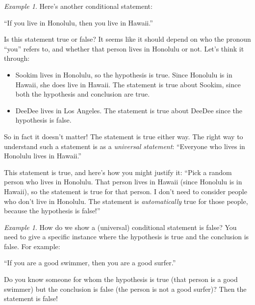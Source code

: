 \documentclass[10pt, reqno]{amsart}
\theoremstyle{remark}
\newtheorem{example}[thm]{Example}
\theoremstyle{definition}
\numberwithin{equation}{section}  %
\begin{document}
\begin{example}
Here's another conditional statement:
\begin{center}
``If you live in Honolulu, then you live in Hawaii.''
\end{center}
Is this statement true or false?  It seems like it should depend on who the pronoun ``you'' refers to, and whether that person lives in Honolulu or not.  Let's think it through:
\begin{itemize}
\item
Sookim lives in Honolulu, so the hypothesis is true.  Since Honolulu is in Hawaii, she does live in Hawaii.  The statement is true about Sookim, since both the hypothesis and conclusion are true.
\item
DeeDee lives in Los Angeles.  The statement is true about DeeDee since the hypothesis is false.
\end{itemize} 

So in fact it doesn't matter!  The statement is true either way.  The right way to understand such a statement is as a \emph{universal statement}: ``Everyone who lives in Honolulu lives in Hawaii.''  

This statement is true, and here's how you might justify it:  ``Pick a random person who lives in Honolulu.  That person lives in Hawaii (since Honolulu is in Hawaii), so the statement is true for that person.  I don't need to consider people who don't live in Honolulu.  The statement is \emph{automatically} true for those people, because the hypothesis is false!''
\end{example}

\begin{example}
How do we show a (universal) conditional statement is false?  You need to give a specific instance where the hypothesis is true and the conclusion is false.  For example:
\begin{center}
``If you are a good swimmer, then you are a good surfer.''
\end{center}
Do you know someone for whom the hypothesis is true (that person is a good swimmer) but the conclusion is false (the person is not a good surfer)?  Then the statement is false!
\end{example}
\end{document}
